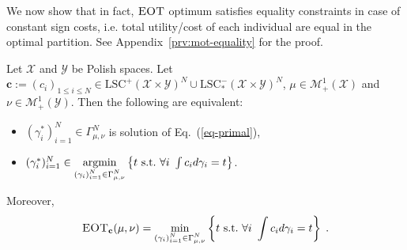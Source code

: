 We now show that in fact, $\textsc{EOT}$ optimum satisfies equality constraints in case of constant sign costs, i.e. total utility/cost of each individual are equal in the optimal partition. See Appendix~\ref{prv:mot-equality} for the proof.
\begin{prop}
\label{prop:mot-equality}
Let $\mathcal{X}$ and $\mathcal{Y}$ be Polish spaces. Let $\mathbf{c}:=(c_i)_{1\leq i\leq N}\in\mathrm{LSC}^+(\mathcal{X}\times\mathcal{Y})^N\cup\mathrm{LSC}^-_{*}(\mathcal{X}\times\mathcal{Y})^N$, $\mu\in\mathcal{M}^1_+(\mathcal{X})$ and  $\nu\in\mathcal{M}^1_+(\mathcal{Y})$. Then the following are equivalent:
\vspace{-0.3cm}
\begin{itemize}
    \item $(\gamma_i^{*})_{i=1}^N\in\Gamma^N_{\mu,\nu}$ is solution of Eq.~(\ref{eq-primal}),
    \item $(\gamma_i^{*})_{i=1}^N\in \operatorname*{argmin}\limits_{\substack{(\gamma_i)_{i=1}^N\in\Gamma^N_{\mu,\nu}
}}   \left\{t~\mathrm{s.t.}~ \forall i~\int c_i d\gamma_i=t\right\}$.
\end{itemize}
\vspace{-0.4cm}
Moreover,
\vspace{-0.3cm}
\begin{align*}
  \textsc{EOT}_{\mathbf{c}}(\mu,\nu) =  \min_{\substack{(\gamma_i)_{i=1}^N\in\Gamma^N_{\mu,\nu}
}}   \left\{t~\mathrm{s.t.}~ \forall i~\int c_i d\gamma_i=t\right\}\; .
\end{align*}
\end{prop}

